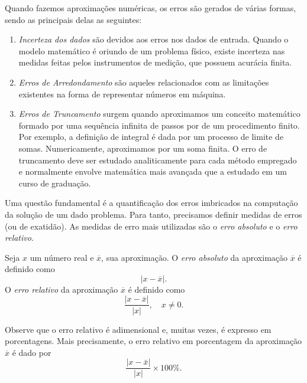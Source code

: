 Quando fazemos aproximações numéricas, os erros são gerados de várias formas, sendo as principais delas as seguintes:
\begin{enumerate}
\item \emph{Incerteza dos dados} são devidos aos erros nos dados de entrada. Quando o modelo matemático é oriundo de um problema físico, existe incerteza nas medidas feitas pelos instrumentos de medição, que possuem acurácia finita.
\item \emph{Erros de Arredondamento} são aqueles relacionados com as limitações existentes na forma de representar números em máquina.
\item \emph{Erros de Truncamento} surgem quando aproximamos um conceito matemático formado por uma sequência infinita de passos por de um procedimento finito. Por exemplo, a definição de integral é dada por um processo de limite de somas. Numericamente, aproximamos por um soma finita. O erro de truncamento deve ser estudado analiticamente para cada método empregado e normalmente envolve matemática mais avançada que a estudado em um curso de graduação.
\end{enumerate}

Uma questão fundamental é a quantificação dos erros imbricados na computação da solução de um dado problema. Para tanto, precisamos definir medidas de erros (ou de exatidão). As medidas de erro mais utilizadas são o \emph{erro absoluto} e o \emph{erro relativo}.

\begin{defn} Seja $x$ um número real e $\overline{x}$, sua aproximação. O \emph{erro absoluto} da aproximação $\overline{x}$ é definido como
  \begin{equation}
    |x-\overline{x}|.
  \end{equation}
O \emph{erro relativo} da aproximação $\overline{x}$ é definido como
\begin{equation}
\frac{|x-\overline{x}|}{|x|},\quad x\neq 0.
\end{equation}
\end{defn}

\begin{obs}
  Observe que o erro relativo é adimensional e, muitas vezes, é expresso em porcentagens. Mais precisamente, o erro relativo em porcentagem da aproximação $\overline{x}$ é dado por
  \begin{equation}
    \frac{|x-\bar{x}|}{|x|}\times 100 \%.
  \end{equation}
\end{obs}

